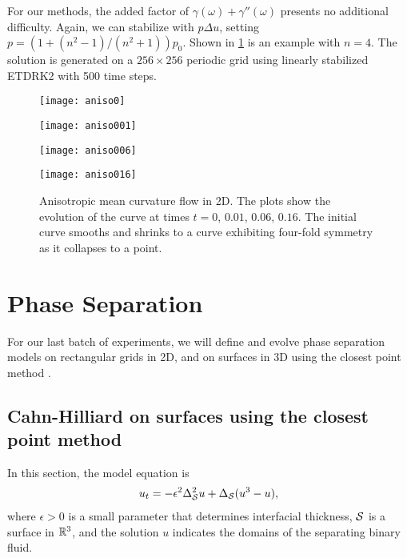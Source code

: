 For our methods, the added factor of $\gamma(\omega) + \gamma''(\omega)$ presents no additional difficulty. Again, we can stabilize with $p\Delta u$, setting $p=(1+(n^2-1)/(n^2+1))p_0$. Shown in \cref{fig:aniso mcm} is an example with $n=4$. The solution is generated on a $256\times 256$ periodic grid using linearly stabilized ETDRK2 with 500 time steps.
\begin{figure}
        \centering
\begin{minipage}{0.44\textwidth}
       \texttt{[image: aniso0]}
\end{minipage}
\begin{minipage}{0.44\textwidth}
       \texttt{[image: aniso001]}
\end{minipage}
\begin{minipage}{0.44\textwidth}
       \texttt{[image: aniso006]}
\end{minipage}
\begin{minipage}{0.44\textwidth}
       \texttt{[image: aniso016]}
\end{minipage}
\caption[Anisotropic mean curvature flow]{Anisotropic mean curvature flow in 2D. The plots show the evolution of the curve at times $t=0$, $0.01$, $0.06$, $0.16$. The initial curve smooths and shrinks to a curve exhibiting four-fold symmetry as it collapses to a point.}
\label{fig:aniso mcm}
\end{figure}

\section{Phase Separation}
For our last batch of experiments, we will define and evolve phase separation models on rectangular grids in 2D, and on surfaces in 3D using the closest point method \cite{ruuth2008simple,macdonald2009implicit}.

\subsection{Cahn-Hilliard on surfaces using the closest point method}
In this section, the model equation is 
\begin{align}
u_t = -\epsilon^2 \Delta_\S^2 u + \Delta_\S(u^3- u),
\label{ch}
\end{align}
where $\epsilon>0$ is a small parameter that determines interfacial thickness, $\S$ is a surface in $\bR^3$, and the solution $u$ indicates the domains of the separating binary fluid.

